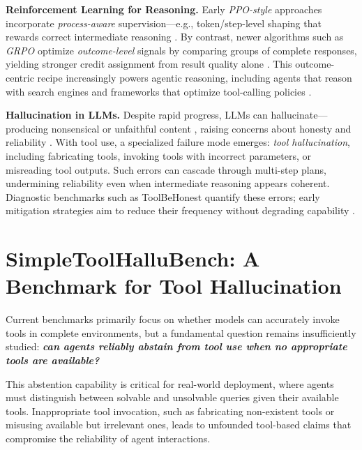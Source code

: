 \documentclass[11pt]{article}
\begin{document}
\textbf{Reinforcement Learning for Reasoning.} Early \emph{PPO-style} approaches incorporate \emph{process-aware} supervision—e.g., token/step-level shaping that rewards correct intermediate reasoning \citep{stiennon2020learning}. By contrast, newer algorithms such as \emph{GRPO} optimize \emph{outcome-level} signals by comparing groups of complete responses, yielding stronger credit assignment from result quality alone \citep{shao2024deepseekmath, guo2025deepseekrl}. This outcome-centric recipe increasingly powers agentic reasoning, including agents that reason with search engines \citep{jin2025search, song2025r1, zheng2025deepresearcher, chen2025learning} and frameworks that optimize tool-calling policies \citep{li2025torl, qian2025toolrl, wang2025otc, wang2025ragen}.

\textbf{Hallucination in LLMs.} Despite rapid progress, LLMs can hallucinate—producing nonsensical or unfaithful content \citep{zhang2025siren}, raising concerns about honesty and reliability \citep{li2024survey, gao2024honestllm, sha2025agentsafealign}. With tool use, a specialized failure mode emerges: \emph{tool hallucination}, including fabricating tools, invoking tools with incorrect parameters, or misreading tool outputs. Such errors can cascade through multi-step plans, undermining reliability even when intermediate reasoning appears coherent. Diagnostic benchmarks such as ToolBeHonest \citep{zhang2024toolbehonest} quantify these errors; early mitigation strategies aim to reduce their frequency without degrading capability \citep{xu2024reducing}.

\section{SimpleToolHalluBench: A Benchmark for Tool Hallucination}
\label{sec:benchmark}

Current benchmarks primarily focus on whether models can accurately invoke tools in complete environments, but a fundamental question remains insufficiently studied: \textbf{\emph{can agents reliably abstain from tool use when no appropriate tools are available?}}

This abstention capability is critical for real-world deployment, where agents must distinguish between solvable and unsolvable queries given their available tools. Inappropriate tool invocation, such as fabricating non-existent tools or misusing available but irrelevant ones, leads to unfounded tool-based claims that compromise the reliability of agent interactions.
\end{document}
